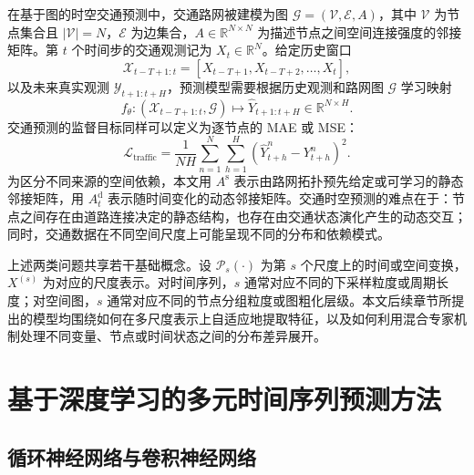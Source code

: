 在基于图的时空交通预测中，交通路网被建模为图 $\mathcal{G}=(\mathcal{V}, \mathcal{E}, A)$，其中 $\mathcal{V}$ 为节点集合且 $\left|\mathcal{V}\right| = N$，$\mathcal{E}$ 为边集合，$A \in \mathbb{R}^{N \times N}$ 为描述节点之间空间连接强度的邻接矩阵。第 $t$ 个时间步的交通观测记为 $X_{t} \in \mathbb{R}^{N}$。给定历史窗口
\begin{equation}
\mathcal{X}_{t-T+1:t} = \left[X_{t-T+1}, X_{t-T+2}, \ldots, X_{t}\right],
\end{equation}
以及未来真实观测 $\mathcal{Y}_{t+1:t+H}$，预测模型需要根据历史观测和路网图 $\mathcal{G}$ 学习映射
\begin{equation}
f_{\theta}: \left(\mathcal{X}_{t-T+1:t}, \mathcal{G}\right) \mapsto \hat{Y}_{t+1:t+H} \in \mathbb{R}^{N \times H}.
\end{equation}
交通预测的监督目标同样可以定义为逐节点的 MAE 或 MSE：
\begin{equation}
\mathcal{L}_{\mathrm{traffic}} = \frac{1}{NH} \sum_{n=1}^{N} \sum_{h=1}^{H}
\left( \hat{Y}_{t+h}^{n} - Y_{t+h}^{n} \right)^{2}.
\end{equation}
为区分不同来源的空间依赖，本文用 $A^{\mathrm{s}}$ 表示由路网拓扑预先给定或可学习的静态邻接矩阵，用 $A^{\mathrm{d}}_{t}$ 表示随时间变化的动态邻接矩阵。交通时空预测的难点在于：节点之间存在由道路连接决定的静态结构，也存在由交通状态演化产生的动态交互；同时，交通数据在不同空间尺度上可能呈现不同的分布和依赖模式。

上述两类问题共享若干基础概念。设 $\mathcal{P}_s(\cdot)$ 为第 $s$ 个尺度上的时间或空间变换，$X^{(s)}$ 为对应的尺度表示。对时间序列，$s$ 通常对应不同的下采样粒度或周期长度；对空间图，$s$ 通常对应不同的节点分组粒度或图粗化层级。本文后续章节所提出的模型均围绕如何在多尺度表示上自适应地提取特征，以及如何利用混合专家机制处理不同变量、节点或时间状态之间的分布差异展开。

\section{基于深度学习的多元时间序列预测方法}

\subsection{循环神经网络与卷积神经网络}

